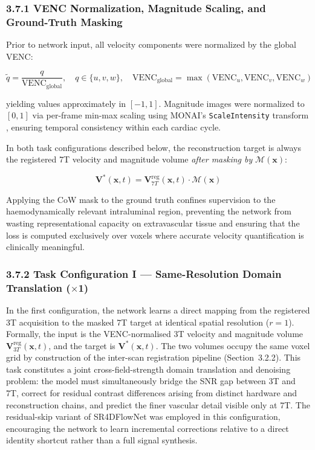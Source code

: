 \subsubsection*{3.7.1 VENC Normalization, Magnitude Scaling, and Ground-Truth Masking}

Prior to network input, all velocity components were normalized by the global VENC:

\begin{equation}
    \tilde{q} = \frac{q}{\text{VENC}_{\text{global}}}, \quad q \in \{u, v, w\},
    \quad \text{VENC}_{\text{global}} = \max(\text{VENC}_u, \text{VENC}_v, \text{VENC}_w)
\end{equation}

yielding values approximately in $[-1, 1]$. Magnitude images were normalized to $[0, 1]$ via per-frame min-max scaling using MONAI's \texttt{ScaleIntensity} transform \cite{cardoso2022monai}, ensuring temporal consistency within each cardiac cycle.

In both task configurations described below, the reconstruction target is always the registered 7T velocity and magnitude volume \emph{after masking by} $\mathcal{M}(\mathbf{x})$:

\begin{equation}
    \mathbf{V}^{*}(\mathbf{x}, t) = \mathbf{V}_{7T}^{\text{reg}}(\mathbf{x}, t) \cdot \mathcal{M}(\mathbf{x})
\end{equation}

Applying the CoW mask to the ground truth confines supervision to the haemodynamically relevant intraluminal region, preventing the network from wasting representational capacity on extravascular tissue and ensuring that the loss is computed exclusively over voxels where accurate velocity quantification is clinically meaningful.

\subsubsection*{3.7.2 Task Configuration I --- Same-Resolution Domain Translation ($\times$1)}

In the first configuration, the network learns a direct mapping from the registered 3T acquisition to the masked 7T target at identical spatial resolution ($r = 1$). Formally, the input is the VENC-normalised 3T velocity and magnitude volume $\mathbf{V}_{3T}^{\text{reg}}(\mathbf{x}, t)$, and the target is $\mathbf{V}^{*}(\mathbf{x}, t)$. The two volumes occupy the same voxel grid by construction of the inter-scan registration pipeline (Section~3.2.2). This task constitutes a joint cross-field-strength domain translation and denoising problem: the model must simultaneously bridge the SNR gap between 3T and 7T, correct for residual contrast differences arising from distinct hardware and reconstruction chains, and predict the finer vascular detail visible only at 7T. The residual-skip variant of SR4DFlowNet was employed in this configuration, encouraging the network to learn incremental corrections relative to a direct identity shortcut rather than a full signal synthesis.

